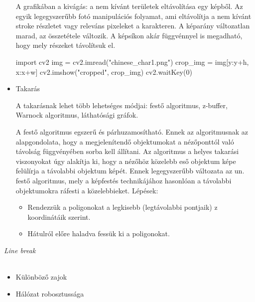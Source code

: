 \begin{itemize}
A grafikában a kivágás: a nem kívánt területek eltávolítása egy képből. Az egyik legegyszerűbb fotó manipulációs folyamat, ami eltávolítja a nem kívánt stroke részletet vagy releváns pixeleket a karakteren. A képarány változatlan marad, az összetétele változik. A képsíkon akár függvénnyel is megadható, hogy mely részeket távolítsuk el.

\begin{python}
import cv2
img = cv2.imread("chinese_char1.png")
crop_img = img[y:y+h, x:x+w]
cv2.imshow("cropped", crop_img)
cv2.waitKey(0)
\end{python}

\item Takarás

A takarásnak lehet több lehetséges módjai: festő algoritmus, z-buffer, Warnock algoritmus, láthatósági gráfok.

A festő algoritmus egszerű és párhuzamosítható. Ennek az algoritmusnak az alapgondolata, hogy a megjelenítendő objektumokat a nézőponttól való távolság függvényében sorba kell állítani. Az algoritmus a helyes takarási viszonyokat úgy alakítja ki, hogy a nézőhöz közelebb eső objektum képe felülírja a távolabbi objektum képét. Ennek legegyszerűbb változata az un. festő algoritmus, mely a képfestés technikájához hasonlóan a távolabbi objektumokra ráfesti a közelebbieket.
Lépések:
\begin{itemize}
\item Rendezzük a poligonokat a legkisebb (legtávolabbi pontjaik) z koordinátáik szerint.
\item Hátulról előre haladva fessük ki a poligonokat. 
\end{itemize}

\end{itemize}

\textit{Line break}\\\\

\begin{itemize}
	\item Különböző zajok
	\item Hálózat robosztussága
\end{itemize}


